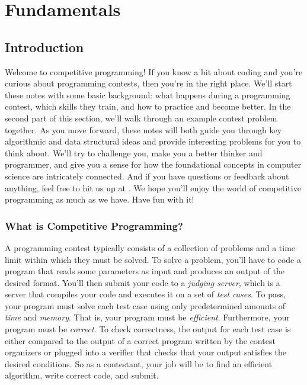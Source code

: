\chapter{Fundamentals}

\section{Introduction}

Welcome to competitive programming! If you know a bit about coding and you're curious about programming contests, then you're in the right place. We'll start these notes with some basic background: what happens during a programming contest, which skills they train, and how to practice and become better. In the second part of this section, we'll walk through an example contest problem together. As you move forward, these notes will both guide you through key algorithmic and data structural ideas and provide interesting problems for you to think about. We'll try to challenge you, make you a better thinker and programmer, and give you a sense for how the foundational concepts in computer science are intricately connected. And if you have questions or feedback about anything, feel free to hit us up at . We hope you'll enjoy the world of competitive programming as much as we have. Have fun with it!

\subsection{What is Competitive Programming?}

A programming contest typically consists of a collection of problems and a time limit within which they must be solved. To solve a problem, you'll have to code a program that reads some parameters as input and produces an output of the desired format. You'll then submit your code to a \emph{judging server}, which is a server that compiles your code and executes it on a set of \emph{test cases}. To pass, your program must solve each test case using only predetermined amounts of \emph{time} and \emph{memory}. That is, your program must be \textit{efficient}. Furthermore, your program must be \textit{correct}. To check correctness, the output for each test case is either compared to the output of a correct program written by the contest organizers or plugged into a verifier that checks that your output satisfies the desired conditions. So as a contestant, your job will be to find an efficient algorithm, write correct code, and submit.

